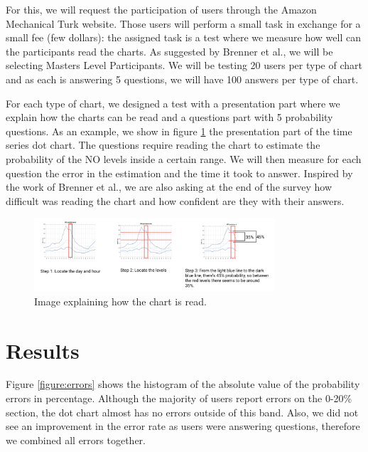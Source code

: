 \documentclass[a4paper,3p,sort&compress]{elsarticle}
\begin{document}
For this, we will request the participation of users through the Amazon Mechanical Turk website. Those users will perform a small task
in exchange for a small fee (few dollars): the assigned task is a test where we measure how well can the participants read the charts.
As suggested by Brenner et al., we will be selecting Masters Level Participants. We will be testing 20 users per type of chart 
and as each is answering 5 questions, we will have 100 answers per type of chart.

For each type of chart, we designed a test with a presentation part where we explain how the charts can be read and a questions part
with 5 probability questions. As an example, we show in figure \ref{figure:explanation} the presentation part of the time series 
dot chart. The questions
require reading the chart to estimate the probability of the NO levels inside a certain range. We will then measure for each question
the error in the estimation and the time it took to answer. Inspired by the work of Brenner et al., we are also asking at the end of 
the survey how difficult was reading the chart and how confident are they with their answers. 

\begin{figure}
  \centering
  \includegraphics[width=0.8\textwidth]{dot_explanation}
  \caption{\label{figure:explanation} Image explaining how the chart is read.  }
\end{figure}  

\section{Results}
\label{sec:results}

Figure \ref{figure:errors} shows the histogram of the absolute value of the probability errors in percentage. 
Although the majority 
of users report errors on the 0-20\% section, the dot chart almost has no errors outside of this band. 
Also, we did not see an improvement in 
the error rate as users were answering questions, therefore we combined all errors together.
\end{document}
